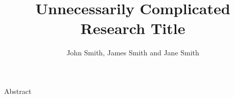 \documentclass{beamer}
\title{Unnecessarily Complicated Research Title} %
\author{John Smith, James Smith and Jane Smith} %
\institute{Department and University Name} %
\begin{document}
\begin{frame} 

\begin{block}{Abstract}
\lipsum[1]
\end{block}

\end{frame}
\end{document}
